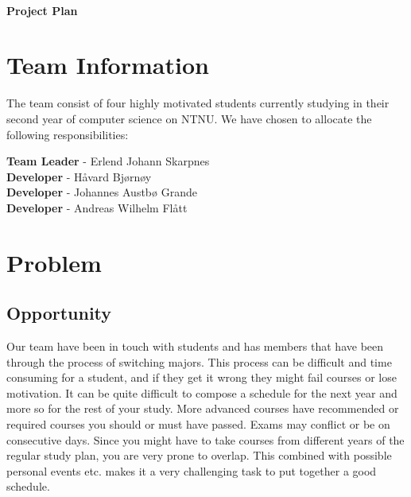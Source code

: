 \documentclass[pdftex, 12pt, norsk, a4paper, twoside]{article}
\numberwithin{equation}{section}
\numberwithin{figure}{section}
\numberwithin{table}{section}
\begin{document}
\makeatletter


\newcommand*{\rom}[1]{\expandafter\@slowromancap\romannumeral #1@}
\makeatother
\hfill\\ %

\begin{center} %
\LARGE{\textbf{Project Plan}}

\tableofcontents

\newpage

\end{center}

\hfill
\hfill


\section{Team Information}

The team consist of four highly motivated students currently studying in their second year of computer science on NTNU. We have chosen to allocate the following responsibilities:

\hfill

{\setlength{\parindent}{0cm}
\textbf{Team Leader} - Erlend Johann Skarpnes\\
\textbf{Developer} - Håvard Bjørnøy\\
\textbf{Developer} - Johannes Austbø Grande\\
\textbf{Developer} - Andreas Wilhelm Flått\\
}

\section{Problem}

\subsection{Opportunity}

Our team have been in touch with students and has members that have been through the process of switching majors. This process can be difficult and time consuming for a student, and if they get it wrong they might fail courses or lose motivation. It can be quite difficult to compose a schedule for the next year and more so for the rest of your study. More advanced courses have recommended or required courses you should or must have passed. Exams may conflict or be on consecutive days. Since you might have to take courses from different years of the regular study plan, you are very prone to overlap. This combined with possible personal events etc. makes it a very challenging task to put together a good schedule. \\
\end{document}
